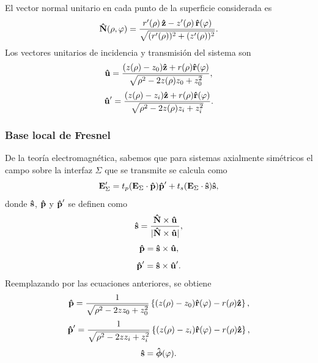 El vector normal unitario en cada punto de la superficie considerada es
\begin{equation}
  \bm{\hat{\mathbf{N}}}(\rho,\varphi)
  =
  \frac{
  r'(\rho)\,\bm{\hat{\mathbf{z}}}
  -
  z'(\rho)\,\bm{\hat{\mathbf{r}}}(\varphi)
  }
  {
  \sqrt{(r'(\rho))^2+(z'(\rho))^2}
  }.
  \label{eq:N_ovoid_rho_phi_app}
\end{equation}
Los vectores unitarios de incidencia y transmisión del sistema son
\begin{equation}
  \bm{\hat{\mathbf{u}}}
  =
  \frac{
  (z(\rho) - z_0)\bm{\hat{\mathbf{z}}}
  +
  r(\rho)\bm{\hat{\mathbf{r}}}(\varphi)
  }
  {
  \sqrt{\rho^2 - 2z(\rho)z_0 + z_0^2}
  },
  \label{eq:u_for_P_in_optical_axis_app}
\end{equation}
\begin{equation}
  \bm{\hat{\mathbf{u}}}'
  =
  \frac{
  (z(\rho) - z_i)\bm{\hat{\mathbf{z}}}
  +
  r(\rho)\bm{\hat{\mathbf{r}}}(\varphi)
  }
  {
  \sqrt{\rho^2 - 2z(\rho)z_i + z_i^2}
  }.
  \label{eq:u_prime_for_P_in_optical_axis_app}
\end{equation}

\subsubsection{Base local de Fresnel}

De la teoría electromagnética, sabemos que para sistemas axialmente simétricos el campo sobre la interfaz $\Sigma$ que se transmite se calcula como
\begin{equation}
  \vb{E}'_{\Sigma}
  =
  t_p (\vb{E}_\Sigma \cdot \bm{\hat{\mathbf{p}}}) \bm{\hat{\mathbf{p}}}'
  +
  t_s (\vb{E}_\Sigma \cdot \bm{\hat{\mathbf{s}}}) \bm{\hat{\mathbf{s}}},
  \label{eq:Transmited_E_field_in_Sigma_app}
\end{equation}
donde $\bm{\hat{\mathbf{s}}}$, $\bm{\hat{\mathbf{p}}}$ y $\bm{\hat{\mathbf{p}}}'$ se definen como
\begin{equation}
    \bm{\hat{\mathbf{s}}}
    =
    \frac{\bm{\hat{\mathbf{N}}} \times \bm{\hat{\mathbf{u}}}}{\lvert  \bm{\hat{\mathbf{N}}} \times \bm{\hat{\mathbf{u}}} \rvert},
    \label{eq:s_hat_def_app}
\end{equation}
\begin{equation}
    \bm{\hat{\mathbf{p}}}
    =
    \bm{\hat{\mathbf{s}}} \times \bm{\hat{\mathbf{u}}},
    \label{eq:p_hat_def_app}
\end{equation}
\begin{equation}
    \bm{\hat{\mathbf{p}}}'
    =
    \bm{\hat{\mathbf{s}}} \times \bm{\hat{\mathbf{u}}}'.
    \label{eq:p_prime_hat_def}
\end{equation}
Reemplazando por las ecuaciones anteriores, se obtiene
\begin{equation}
  \bm{\hat{\mathbf{p}}}
  =
  \frac{1}{\sqrt{\rho^2 - 2zz_0 + z_0^2}}
  \left\{
  (z(\rho) - z_0)\bm{\hat{\mathbf{r}}}(\varphi)
  -
  r(\rho)\bm{\hat{\mathbf{z}}}
  \right\},
  \label{eq:p_mode_ovoid}
\end{equation}
\begin{equation}
  \bm{\hat{\mathbf{p}}}'
  =
  \frac{1}{\sqrt{\rho^2 - 2zz_i + z_i^2}}
  \left\{
  (z(\rho) - z_i)\bm{\hat{\mathbf{r}}}(\varphi)
  -
  r(\rho)\bm{\hat{\mathbf{z}}}
  \right\},
  \label{eq:p_prime_mode_ovoid}
\end{equation}
\begin{equation}
  \bm{\hat{\mathbf{s}}}
  =
  \bm{\hat{\mathbf{\phi}}}(\varphi).
  \label{eq:s_mode_ovoid}
\end{equation}

